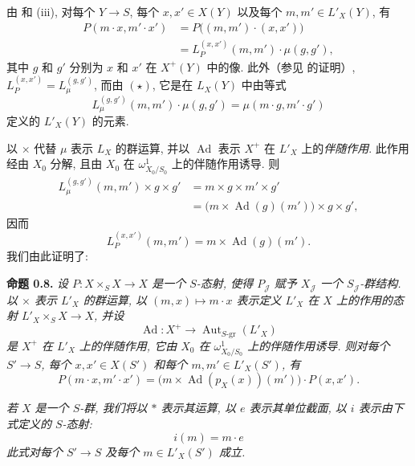 由 和 (iii),
对每个 \(Y\to S\), 每个 \(x,x'\in X(Y)\) 以及每个
\(m,m'\in L'_X(Y)\), 有
\[
\begin{aligned}
 P(m\mathbin{\cdot}x,m'\mathbin{\cdot}x')
 &=P\bigl((m,m')\mathbin{\cdot}(x,x')\bigr)\\
 &=L_P^{(x,x')}(m,m')\mathbin{\cdot}\mu(g,g'),
\end{aligned}
\]
其中 \(g\) 和 \(g'\) 分别为 \(x\) 和 \(x'\) 在 \(X^+(Y)\) 中的像.
此外（参见  的证明）,
\(L_P^{(x,x')}=L_\mu^{(g,g')}\), 而由
 \((\star)\),
它是在 \(L_X(Y)\) 中由等式
\[
 L_\mu^{(g,g')}(m,m')\mathbin{\cdot}\mu(g,g')
   =\mu(m\mathbin{\cdot}g,m'\mathbin{\cdot}g')
\]
定义的 \(L'_X(Y)\) 的元素.

以 \(\times\) 代替 \(\mu\) 表示 \(L_X\) 的群运算,
并以 \(\operatorname{Ad}\) 表示 \(X^+\) 在 \(L'_X\) 上的\emph{伴随作用}.
此作用经由 \(X_0\) 分解, 且由 \(X_0\) 在
\(\omega^1_{X_0/S_0}\) 上的伴随作用诱导. 则
\[
\begin{aligned}
 L_\mu^{(g,g')}(m,m')\times g\times g'
 &=m\times g\times m'\times g'\\
 &=\bigl(m\times\operatorname{Ad}(g)(m')\bigr)\times g\times g',
\end{aligned}
\]
因而
\[
 L_P^{(x,x')}(m,m')=m\times\operatorname{Ad}(g)(m').
\]
我们由此证明了:

\medskip
\noindent{}\textbf{命题 0.8.}
\textit{设 \(P:X\times_S X\to X\) 是一个 \(S\)-态射,
使得 \(P_{\mathscr J}\) 赋予 \(X_{\mathscr J}\) 一个
\(S_{\mathscr J}\)-群结构. 以 \(\times\) 表示 \(L'_X\) 的群运算,
以 \((m,x)\mapsto m\mathbin{\cdot}x\) 表示定义 \(L'_X\)
在 \(X\) 上的作用的态射 \(L'_X\times_S X\to X\), 并设}
\[
 \operatorname{Ad}:X^+\longrightarrow
 \operatorname{Aut}_{S\text{-}\mathrm{gr}}(L'_X)
\]
\textit{是 \(X^+\) 在 \(L'_X\) 上的伴随作用,
它由 \(X_0\) 在 \(\omega^1_{X_0/S_0}\) 上的伴随作用诱导.
则对每个 \(S'\to S\), 每个 \(x,x'\in X(S')\) 和每个
\(m,m'\in L'_X(S')\), 有}
\begin{equation}
 P(m\mathbin{\cdot}x,m'\mathbin{\cdot}x')
 =\bigl(m\times\operatorname{Ad}(p_X(x))(m')\bigr)
    \mathbin{\cdot}P(x,x').
 \tag{0.8.1}\label{sga3:iii:proposition:0-8:equation:0-8-1}
\end{equation}

\textit{若 \(X\) 是一个 \(S\)-群, 我们将以 \(\ast\) 表示其运算,
以 \(e\) 表示其单位截面, 以 \(i\) 表示由下式定义的 \(S\)-态射:}
\[
 i(m)=m\mathbin{\cdot}e
\]
\textit{此式对每个 \(S'\to S\) 及每个 \(m\in L'_X(S')\) 成立.}

